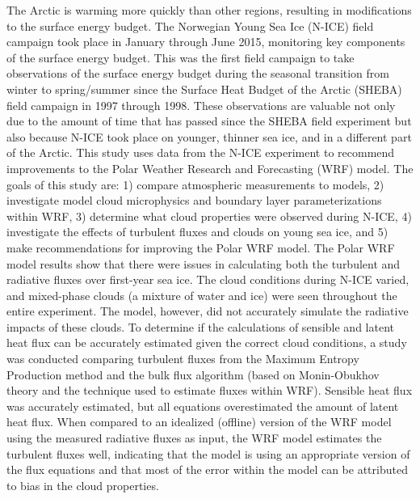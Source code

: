 The Arctic is warming more quickly than other regions, resulting in modifications to the surface energy budget. The Norwegian Young Sea Ice (N-ICE) field campaign took place in January through June 2015, monitoring key components of the surface energy budget. This was the first field campaign to take observations of the surface energy budget during the seasonal transition from winter to spring/summer since the Surface Heat Budget of the Arctic (SHEBA) field campaign in 1997 through 1998. These observations are valuable not only due to the amount of time that has passed since the SHEBA field experiment but also because N-ICE took place on younger, thinner sea ice, and in a different part of the Arctic. This study uses data from the N-ICE experiment to recommend improvements to the Polar Weather Research and Forecasting (WRF) model. The goals of this study are: 1) compare atmospheric measurements to models, 2) investigate model cloud microphysics and boundary layer parameterizations within WRF, 3) determine what cloud properties were observed during N-ICE, 4) investigate the effects of turbulent fluxes and clouds on young sea ice, and 5) make recommendations for improving the Polar WRF model. The Polar WRF model results show that there were issues in calculating both the turbulent and radiative fluxes over first-year sea ice. The cloud conditions during N-ICE varied, and mixed-phase clouds (a mixture of water and ice) were seen throughout the entire experiment. The model, however, did not accurately simulate the radiative impacts of these clouds. To determine if the calculations of sensible and latent heat flux can be accurately estimated given the correct cloud conditions, a study was conducted comparing turbulent fluxes from the Maximum Entropy Production method and the bulk flux algorithm (based on Monin-Obukhov theory and the technique used to estimate fluxes within WRF). Sensible heat flux was accurately estimated, but all equations overestimated the amount of latent heat flux. When compared to an idealized (offline) version of the WRF model using the measured radiative fluxes as input, the WRF model estimates the turbulent fluxes well, indicating that the model is using an appropriate version of the flux equations and that most of the error within the model can be attributed to bias in the cloud properties.